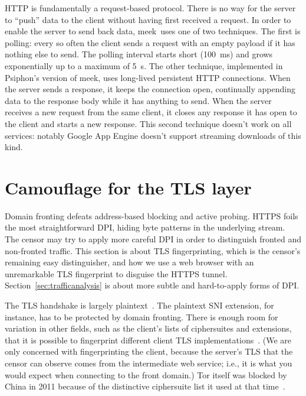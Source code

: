 \documentclass[conference]{IEEEtran}
\def\meek{meek}
\begin{document}
HTTP is fundamentally a request-based protocol.
There is no way for the server to ``push'' data to the client without
having first received a request.
In order to enable the server to send back data,
\meek\ uses one of two techniques.
The first is polling:
every so often the client sends a request with an empty payload
if it has nothing else to send.
The polling interval starts short (100~ms) and grows exponentially
up to a maximum of 5~s.
The other technique,
implemented in Psiphon's version of \meek,
uses long-lived persistent HTTP connections.
When the server sends a response, it keeps the connection open,
continually appending data to the response body while it has anything to send.
When the server receives a new request from the same client,
it closes any response it has open to the client and starts a new response.
This second technique doesn't work on all services:
notably Google App Engine doesn't support streaming downloads of this kind.

\section{Camouflage for the TLS layer}
\label{sec:browserextension}

Domain fronting defeats address-based blocking and active probing.
HTTPS foils the most straightforward DPI,
hiding byte patterns in the underlying stream.
The censor may try to apply more careful DPI in order to
distinguish fronted and non-fronted traffic.
This section is about TLS fingerprinting,
which is the censor's remaining easy distinguisher,
and how we use a web browser with an unremarkable TLS fingerprint
to disguise the HTTPS tunnel.
Section~\ref{sec:trafficanalysis} is about more subtle and hard-to-apply forms of DPI.

The TLS handshake is largely plaintext~\cite[Section~7.4]{rfc5246}.
The plaintext SNI extension, for instance, has to be protected by domain fronting.
There is enough room for variation in other fields,
such as the client's lists of ciphersuites and extensions,
that it is possible to fingerprint different client TLS implementations~\cite{ssl-p0f}.
(We are only concerned with fingerprinting the client,
because the server's TLS that the censor can observe
comes from the intermediate web service;
i.e., it is what you would expect when connecting to the front domain.)
Tor itself was blocked by China in 2011
because of the distinctive ciphersuite list it used at that time~\cite{bug4744}.
\end{document}
